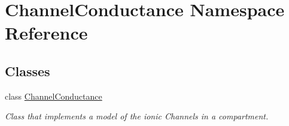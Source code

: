 \hypertarget{namespace_channel_conductance}{}\section{Channel\+Conductance Namespace Reference}
\label{namespace_channel_conductance}
\subsection*{Classes}
\begin{DoxyCompactItemize}
\item 
class \hyperlink{class_channel_conductance_1_1_channel_conductance}{Channel\+Conductance}
\begin{DoxyCompactList}\small\item\em Class that implements a model of the ionic Channels in a compartment. \end{DoxyCompactList}\end{DoxyCompactItemize}
